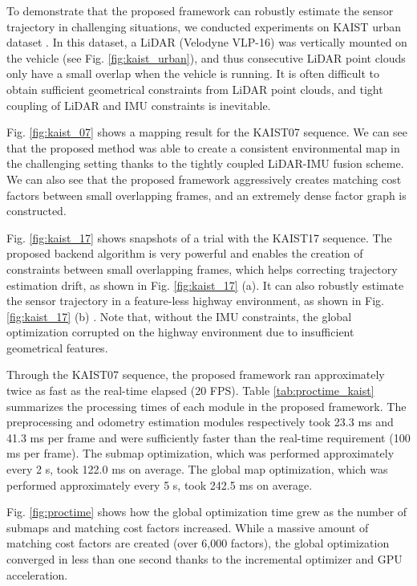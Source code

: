 \documentclass[letterpaper, 10 pt, conference]{ieeeconf}  %
\begin{document}
To demonstrate that the proposed framework can robustly estimate the sensor trajectory in challenging situations, we conducted experiments on KAIST urban dataset \cite{Jeong2018}. In this dataset, a LiDAR (Velodyne VLP-16) was vertically mounted on the vehicle (see Fig. \ref{fig:kaist_urban}), and thus consecutive LiDAR point clouds only have a small overlap when the vehicle is running. It is often difficult to obtain sufficient geometrical constraints from LiDAR point clouds, and tight coupling of LiDAR and IMU constraints is inevitable.

Fig. \ref{fig:kaist_07} shows a mapping result for the KAIST07 sequence. We can see that the proposed method was able to create a consistent environmental map in the challenging setting thanks to the tightly coupled LiDAR-IMU fusion scheme. We can also see that the proposed framework aggressively creates matching cost factors between small overlapping frames, and an extremely dense factor graph is constructed.

Fig. \ref{fig:kaist_17} shows snapshots of a trial with the KAIST17 sequence. The proposed backend algorithm is very powerful and enables the creation of constraints between small overlapping frames, which  helps correcting trajectory estimation drift, as shown in Fig. \ref{fig:kaist_17} (a). It can also robustly estimate the sensor trajectory in a feature-less highway environment, as shown in Fig. \ref{fig:kaist_17} (b) \footnotemark[2]. Note that, without the IMU constraints, the global optimization corrupted on the highway environment due to insufficient geometrical features.

Through the KAIST07 sequence, the proposed framework ran approximately twice as fast as the real-time elapsed (20 FPS). Table \ref{tab:proctime_kaist} summarizes the processing times of each module in the proposed framework. The preprocessing and odometry estimation modules respectively took 23.3 ms and 41.3 ms per frame and were sufficiently faster than the real-time requirement (100 ms per frame). The submap optimization, which was performed approximately every 2 s, took 122.0 ms on average. The global map optimization, which was performed approximately every 5 s, took 242.5 ms on average. 

Fig. \ref{fig:proctime} shows how the global optimization time grew as the number of submaps and matching cost factors increased. While a massive amount of matching cost factors are created (over 6,000 factors), the global optimization converged in less than one second thanks to the incremental optimizer and GPU acceleration.
\end{document}
